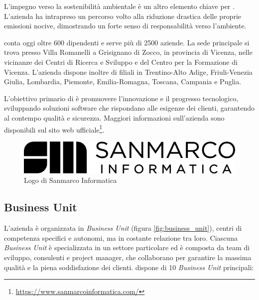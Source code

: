 L'impegno verso la sostenibilità ambientale è un altro elemento chiave per \myCompany. L'azienda ha intrapreso un percorso volto alla riduzione drastica delle proprie emissioni nocive, dimostrando un forte senso di responsabilità verso l'ambiente.

\myCompany conta oggi oltre 600 dipendenti e serve più di 2500 aziende. La sede principale si trova presso Villa Romanelli a Grisignano di Zocco, in provincia di Vicenza, nelle vicinanze dei Centri di Ricerca e Sviluppo e del Centro per la Formazione di Vicenza. L'azienda dispone inoltre di filiali in Trentino-Alto Adige, Friuli-Venezia Giulia, Lombardia, Piemonte, Emilia-Romagna, Toscana, Campania e Puglia.

L'obiettivo primario di \myCompany è promuovere l'innovazione e il progresso tecnologico, sviluppando soluzioni software che rispondano alle esigenze dei clienti, garantendo al contempo qualità e sicurezza. Maggiori informazioni sull'azienda sono disponibili sul sito web ufficiale\footnote{\url{https://www.sanmarcoinformatica.com/}}.

\begin{figure}[h!]
    \centering
    \includegraphics[width=0.5\columnwidth]{img/logo_sanmarco_informatica.png}
    \caption{Logo di Sanmarco Informatica}
    \label{fig:entanglement}
\end{figure}
\subsection{Business Unit}
L'azienda è organizzata in \emph{Business Unit} (figura \ref{fig:business_unit}), centri di competenza specifici e autonomi, ma in costante relazione tra loro. Ciascuna \emph{Business Unit} è specializzata in un settore particolare ed è composta da team di sviluppo, consulenti e project manager, che collaborano per garantire la massima qualità e la piena soddisfazione dei clienti. \myCompany dispone di 10 \emph{Business Unit} principali:


